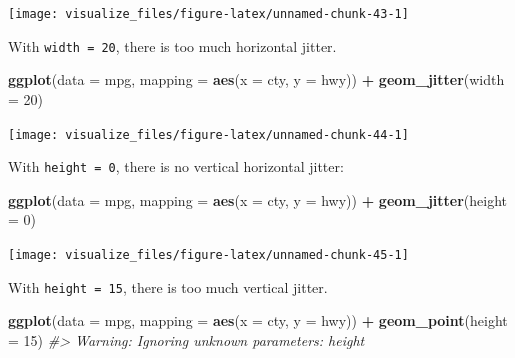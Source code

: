 \documentclass[]{book}
\newenvironment{Shaded}{\begin{snugshade}}{\end{snugshade}}
\newcommand{\CommentTok}[1]{\textcolor[rgb]{0.56,0.35,0.01}{\textit{#1}}}
\newcommand{\DataTypeTok}[1]{\textcolor[rgb]{0.13,0.29,0.53}{#1}}
\newcommand{\DecValTok}[1]{\textcolor[rgb]{0.00,0.00,0.81}{#1}}
\newcommand{\KeywordTok}[1]{\textcolor[rgb]{0.13,0.29,0.53}{\textbf{#1}}}
\newcommand{\NormalTok}[1]{#1}
\newcommand{\OperatorTok}[1]{\textcolor[rgb]{0.81,0.36,0.00}{\textbf{#1}}}
\newcommand{\StringTok}[1]{\textcolor[rgb]{0.31,0.60,0.02}{#1}}
\theoremstyle{plain}
\theoremstyle{remark}
\begin{document}
\begin{center}\texttt{[image: visualize\_files/figure-latex/unnamed-chunk-43-1]} \end{center}

With \texttt{width\ =\ 20}, there is too much horizontal jitter.

\begin{Shaded}
\begin{Highlighting}[]
\KeywordTok{ggplot}\NormalTok{(}\DataTypeTok{data =}\NormalTok{ mpg, }\DataTypeTok{mapping =} \KeywordTok{aes}\NormalTok{(}\DataTypeTok{x =}\NormalTok{ cty, }\DataTypeTok{y =}\NormalTok{ hwy)) }\OperatorTok{+}
\StringTok{  }\KeywordTok{geom_jitter}\NormalTok{(}\DataTypeTok{width =} \DecValTok{20}\NormalTok{)}
\end{Highlighting}
\end{Shaded}

\begin{center}\texttt{[image: visualize\_files/figure-latex/unnamed-chunk-44-1]} \end{center}

With \texttt{height\ =\ 0}, there is no vertical horizontal jitter:

\begin{Shaded}
\begin{Highlighting}[]
\KeywordTok{ggplot}\NormalTok{(}\DataTypeTok{data =}\NormalTok{ mpg, }\DataTypeTok{mapping =} \KeywordTok{aes}\NormalTok{(}\DataTypeTok{x =}\NormalTok{ cty, }\DataTypeTok{y =}\NormalTok{ hwy)) }\OperatorTok{+}
\StringTok{  }\KeywordTok{geom_jitter}\NormalTok{(}\DataTypeTok{height =} \DecValTok{0}\NormalTok{)}
\end{Highlighting}
\end{Shaded}

\begin{center}\texttt{[image: visualize\_files/figure-latex/unnamed-chunk-45-1]} \end{center}

With \texttt{height\ =\ 15}, there is too much vertical jitter.

\begin{Shaded}
\begin{Highlighting}[]
\KeywordTok{ggplot}\NormalTok{(}\DataTypeTok{data =}\NormalTok{ mpg, }\DataTypeTok{mapping =} \KeywordTok{aes}\NormalTok{(}\DataTypeTok{x =}\NormalTok{ cty, }\DataTypeTok{y =}\NormalTok{ hwy)) }\OperatorTok{+}
\StringTok{  }\KeywordTok{geom_point}\NormalTok{(}\DataTypeTok{height =} \DecValTok{15}\NormalTok{)}
\CommentTok{#> Warning: Ignoring unknown parameters: height}
\end{Highlighting}
\end{Shaded}
\end{document}
